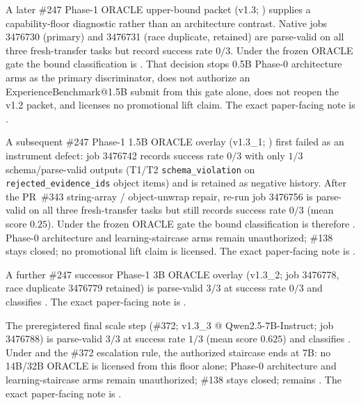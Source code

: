 \begin{sloppypar}
A later \#247 Phase-1 ORACLE upper-bound packet (v1.3;
) supplies a capability-floor
diagnostic rather than an architecture contrast.  Native jobs 3476730
(primary) and 3476731 (race duplicate, retained) are parse-valid on all
three fresh-transfer tasks but record success rate $0/3$.  Under the
frozen ORACLE gate the bound classification is
.  That decision stops 0.5B Phase-0
architecture arms as the primary discriminator, does not authorize an
ExperienceBenchmark@1.5B submit from this gate alone, does not reopen
the v1.2 packet, and licenses no promotional lift claim.  The exact
paper-facing note is
.
\end{sloppypar}

\begin{sloppypar}
A subsequent \#247 Phase-1 1.5B ORACLE overlay (v1.3\_1;
) first failed as an instrument defect:
job 3476742 records success rate $0/3$ with only $1/3$ schema/parse-valid outputs
(T1/T2 \texttt{schema\_violation} on \texttt{rejected\_evidence\_ids} object items) and
is retained as  negative history.  After the PR~\#343
string-array / object-unwrap repair, re-run job 3476756 is parse-valid on all
three fresh-transfer tasks but still records success rate $0/3$ (mean score
$0.25$).  Under the frozen ORACLE gate the bound classification is therefore
.  Phase-0 architecture and learning-staircase
arms remain unauthorized; \#138 stays closed; no promotional lift claim is
licensed.  The exact paper-facing note is
.
\end{sloppypar}

\begin{sloppypar}
A further \#247 successor Phase-1 3B ORACLE overlay (v1.3\_2; job 3476778,
race duplicate 3476779 retained) is parse-valid $3/3$ at success rate $0/3$
and classifies .  The exact paper-facing note is
.
\end{sloppypar}

\begin{sloppypar}
The preregistered final scale step (\#372; v1.3\_3 @ Qwen2.5-7B-Instruct;
job 3476788) is parse-valid $3/3$ at success rate $1/3$ (mean score $0.625$)
and classifies .  Under
 and the \#372 escalation
rule, the authorized staircase ends at 7B: no 14B/32B ORACLE is licensed from
this floor alone; Phase-0 architecture and learning-staircase arms remain
unauthorized; \#138 stays closed;  remains
.  The exact paper-facing note is
.
\end{sloppypar}


